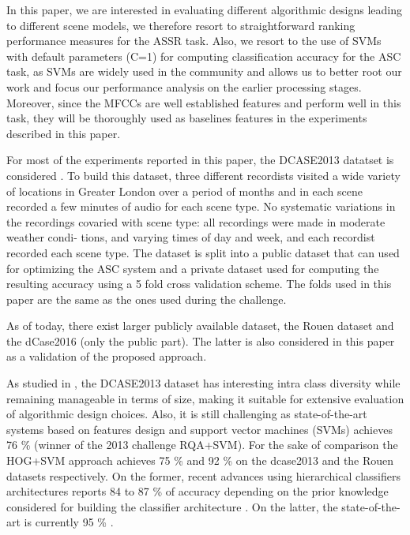 \documentclass[journal]{IEEEtran}
\newcommand{\gl}[1]{\textcolor{red}{Gr\'egoire : #1}}
\begin{document}
In this paper, we are interested in evaluating different algorithmic designs leading to different scene models, we therefore resort to straightforward ranking performance measures for the ASSR task. Also, we resort to the use of SVMs with default parameters (C=1) for computing classification accuracy for the ASC task, as SVMs are widely used in the community and allows us to better root our work and focus our performance analysis on the earlier processing stages. Moreover, since the MFCCs are well established features and perform well in this task, they will be thoroughly used as baselines features in the experiments described in this paper.

 


For most of the experiments reported in this paper, the DCASE2013 datatset is considered \cite{giannoulis2013database, 7100934}. To build this dataset, three different recordists visited a wide variety of locations in Greater London over
a period of months and in each
scene recorded a few minutes of audio for each scene type. No
systematic variations in the recordings covaried with scene
type: all recordings were made in moderate weather condi-
tions, and varying times of day and week, and each recordist
recorded each scene type. The dataset is split into a public dataset that can used for optimizing the ASC system and a private dataset used for computing the resulting accuracy using a 5 fold cross validation scheme. The folds used in this paper are the same as the ones used during the challenge.

As of today, there exist larger publicly available dataset, the
Rouen dataset \cite{rakotomamonjy2015histogram} and the dCase2016 \cite{Mesaros2016_EUSIPCO} (only the public part). The latter is also considered in this paper as a validation of the proposed approach.

As studied in \cite{lagrange:hal-01082501}, the DCASE2013 dataset has interesting intra class diversity while remaining manageable in terms of size, making it suitable for extensive evaluation of algorithmic design choices. Also, it is still challenging as state-of-the-art systems based on features design and support vector machines (SVMs) achieves 76 \% \cite{roma2013} (winner of the 2013 challenge RQA+SVM). For the sake of comparison the HOG+SVM approach \cite{rakotomamonjy2015histogram} achieves 75 \% and 92 \% on the dcase2013 and the Rouen datasets respectively. On the former, recent advances using hierarchical classifiers architectures reports 84 to 87 \% of accuracy depending on the prior knowledge considered for building the classifier architecture \cite{phan2016label}. On the latter, the state-of-the-art is currently 95 \% \cite{bisot2016acoustic}. 
\end{document}
